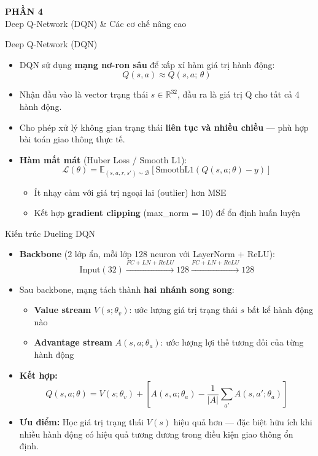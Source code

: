 
\begin{frame}
  \centering
  \Huge \textbf{PHẦN 4} \\[0.5cm]
  \LARGE Deep Q-Network (DQN) \& Các cơ chế nâng cao
\end{frame}

\begin{frame}{Deep Q-Network (DQN)}
\begin{itemize}
    \item DQN sử dụng \textbf{mạng nơ-ron sâu} để xấp xỉ hàm giá trị hành động:
    \[
    Q(s, a) \approx Q(s, a;\, \theta)
    \]
    \item Nhận đầu vào là vector trạng thái $s \in \mathbb{R}^{32}$, đầu ra là giá trị Q cho tất cả 4 hành động.
    \item Cho phép xử lý không gian trạng thái \textbf{liên tục và nhiều chiều} — phù hợp bài toán giao thông thực tế.
    \item \textbf{Hàm mất mát} (Huber Loss / Smooth L1):
    \[
    \mathcal{L}(\theta) = \mathbb{E}_{(s,a,r,s') \sim \mathcal{B}}\!\left[\text{SmoothL1}\!\left(Q(s,a;\theta) - y\right)\right]
    \]
    \begin{itemize}
        \item Ít nhạy cảm với giá trị ngoại lai (outlier) hơn MSE
        \item Kết hợp \textbf{gradient clipping} (max\_norm = 10) để ổn định huấn luyện
    \end{itemize}
\end{itemize}
\end{frame}

\begin{frame}{Kiến trúc Dueling DQN}
\begin{itemize}
    \item \textbf{Backbone} (2 lớp ẩn, mỗi lớp 128 neuron với LayerNorm + ReLU):
    \[
    \text{Input}(32) \xrightarrow{FC+LN+ReLU} 128 \xrightarrow{FC+LN+ReLU} 128
    \]
    \item Sau backbone, mạng tách thành \textbf{hai nhánh song song}:
    \begin{itemize}
        \item \textbf{Value stream} $V(s;\theta_v)$: ước lượng giá trị trạng thái $s$ bất kể hành động nào
        \item \textbf{Advantage stream} $A(s,a;\theta_a)$: ước lượng lợi thế tương đối của từng hành động
    \end{itemize}
    \item \textbf{Kết hợp:}
    \[
    Q(s,a;\theta) = V(s;\theta_v) + \left[A(s,a;\theta_a) - \frac{1}{|A|}\sum_{a'} A(s,a';\theta_a)\right]
    \]
    \item \textbf{Ưu điểm:} Học giá trị trạng thái $V(s)$ hiệu quả hơn — đặc biệt hữu ích khi nhiều hành động có hiệu quả tương đương trong điều kiện giao thông ổn định.
\end{itemize}
\end{frame}

